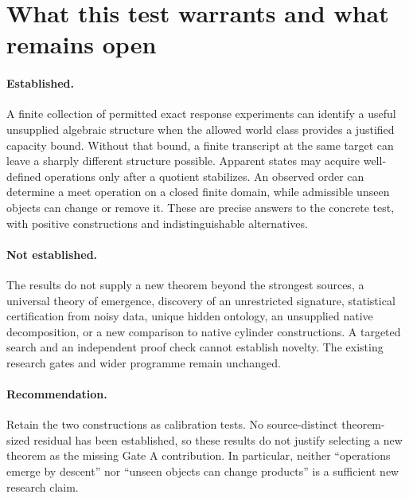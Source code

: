 \documentclass[11pt]{article}
\theoremstyle{remark}
\begin{document}
\section{What this test warrants and what remains open}
\label{sec:conclusion}

\paragraph{Established.}
A finite collection of permitted exact response experiments can identify a useful unsupplied algebraic structure when the allowed world class provides a justified capacity bound. Without that bound, a finite transcript at the same target can leave a sharply different structure possible. Apparent states may acquire well-defined operations only after a quotient stabilizes. An observed order can determine a meet operation on a closed finite domain, while admissible unseen objects can change or remove it. These are precise answers to the concrete test, with positive constructions and indistinguishable alternatives.

\paragraph{Not established.}
The results do not supply a new theorem beyond the strongest sources, a universal theory of emergence, discovery of an unrestricted signature, statistical certification from noisy data, unique hidden ontology, an unsupplied native decomposition, or a new comparison to native cylinder constructions. A targeted search and an independent proof check cannot establish novelty. The existing research gates and wider programme remain unchanged.

\paragraph{Recommendation.}
Retain the two constructions as calibration tests. No source-distinct theorem-sized residual has been established, so these results do not justify selecting a new theorem as the missing Gate A contribution. In particular, neither ``operations emerge by descent'' nor ``unseen objects can change products'' is a sufficient new research claim.
\end{document}
